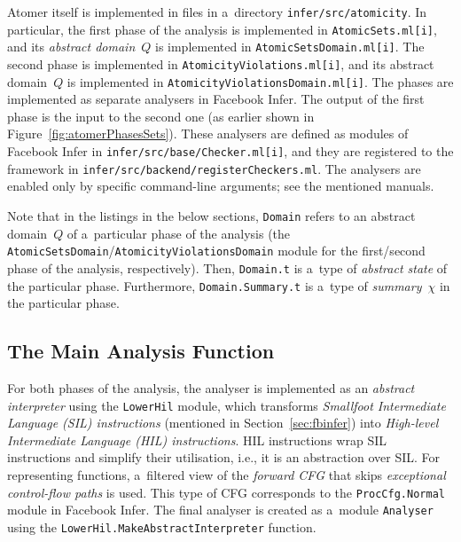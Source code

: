 Atomer itself is implemented in files in a~directory \texttt{infer/src/atomicity}. In particular, the first phase of the analysis is implemented in \texttt{AtomicSets.ml[i]}, and its \emph{abstract domain}~$ Q $ is implemented in \texttt{AtomicSetsDomain.ml[i]}. The second phase is implemented in \texttt{AtomicityViolations.ml[i]}, and its abstract domain~$ Q $ is implemented in \texttt{AtomicityViolationsDomain.ml[i]}. The phases are implemented as separate analysers in Facebook Infer. The output of the first phase is the input to the second one (as earlier shown in Figure~\ref{fig:atomerPhasesSets}). These analysers are defined as modules of Facebook Infer in \texttt{infer/src/base/Checker.ml[i]}, and they are registered to the framework in \texttt{infer/src/backend/registerCheckers.ml}. The analysers are enabled only by specific command-line arguments; see the mentioned manuals.

Note that in the listings in the below sections, \texttt{Domain} refers to an abstract domain~$ Q $ of a~particular phase of the analysis (the \texttt{AtomicSetsDomain}/\texttt{AtomicityViolationsDomain} module for the first/second phase of the analysis, respectively). Then, \texttt{Domain.t} is a~type of \emph{abstract state} of the particular phase. Furthermore, \texttt{Domain.Summary.t} is a~type of \emph{summary}~$ \chi $ in the particular phase.

\subsection{The Main Analysis Function}

For both phases of the analysis, the analyser is implemented as an \emph{abstract interpreter} using the \texttt{LowerHil} module, which transforms \emph{Smallfoot Intermediate Language (SIL) instructions} (mentioned in Section~\ref{sec:fbinfer}) into \emph{High-level Intermediate Language (HIL) instructions}. HIL instructions wrap SIL instructions and simplify their utilisation, i.e., it is an abstraction over SIL. For representing functions, a~filtered view of the \emph{forward CFG} that skips \emph{exceptional control-flow paths} is used. This type of CFG corresponds to the \texttt{ProcCfg.Normal} module in Facebook Infer. The final analyser is created as a~module \texttt{Analyser} using the \texttt{LowerHil.MakeAbstractInterpreter} function.

